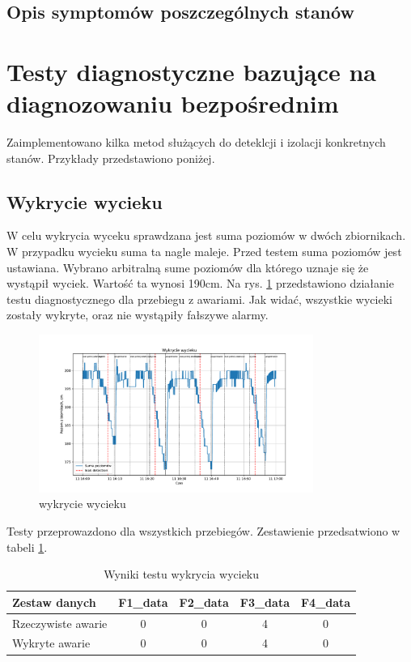 \documentclass[a4paper,12pt]{article}
\begin{document}
\subsection{Opis symptomów poszczególnych stanów}


\section{Testy diagnostyczne bazujące na diagnozowaniu bezpośrednim}

Zaimplementowano kilka metod służących do deteklcji i izolacji konkretnych stanów. Przykłady przedstawiono poniżej.

\subsection{Wykrycie wycieku}

W celu wykrycia wyceku sprawdzana jest suma poziomów w dwóch zbiornikach. W przypadku wycieku suma ta nagle maleje. Przed testem suma poziomów jest ustawiana. Wybrano arbitralną sume poziomów dla którego uznaje się że wystąpił wyciek. Wartość ta wynosi 190cm. Na rys. \ref{fig:wyciek1} przedstawiono działanie testu diagnostycznego dla przebiegu z awariami. Jak widać, wszystkie wycieki zostały wykryte, oraz nie wystąpiły fałszywe alarmy.

\begin{figure}[H]
        \centering
        \includegraphics[width=0.8\textwidth]{leak_detection}
        \caption{wykrycie wycieku}
        \label{fig:wyciek1}
\end{figure}

Testy przeprowazdono dla wszystkich przebiegów. Zestawienie przedsatwiono w tabeli \ref{tab:wyciek2}.

\begin{table}[H]
\centering
\caption{Wyniki testu wykrycia wycieku}
\begin{tabular}{lcccc}
\toprule
Zestaw danych & F1\_data & F2\_data & F3\_data & F4\_data\\
\midrule
Rzeczywiste awarie & 0 & 0 & 4 & 0\\
Wykryte awarie & 0 & 0 & 4 & 0\\
\bottomrule
\end{tabular}
\label{tab:wyciek2}
\end{table}
\end{document}
